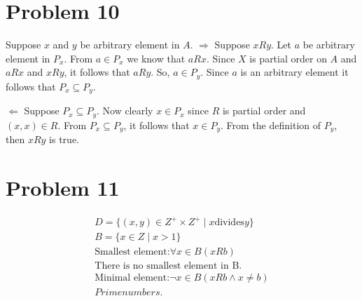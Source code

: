 \documentclass{article}
\begin{document}
\section{Problem 10}
Suppose $x$ and $y$ be arbitrary element in $A$.
$\Rightarrow$ Suppose $xRy$. Let $a$ be arbitrary element in $P_x$.
From $a \in P_x$ we know that $aRx$. Since $X$ is partial order on $A$
and $aRx$ and $xRy$, it follows that $aRy$. So, $a \in P_y$. Since $a$
is an arbitrary element it follows that $P_x \subseteq P_y$.

$\Leftarrow$ Suppose $P_x \subseteq P_y$. Now clearly $x \in P_x$
since $R$ is partial order and $(x,x) \in R$. From $P_x \subseteq
P_y$, it follows that $x \in P_y$. From the definition of $P_y$, then
$xRy$ is true.

\section{Problem 11}
\begin{align*}
  D = \{(x,y) \in Z^{+} \times Z^{+} \mid x \text{divides} y \} \\
  B = \{x \in Z \mid x > 1\} \\
  \text{Smallest element:} \forall x \in B(x R b) \\
  \text{There is no smallest element in B.} \\
  \text{Minimal element:} \neg x \in B(xRb \land x \neq b) \\
  Prime numbers.
\end{align*}
\end{document}
